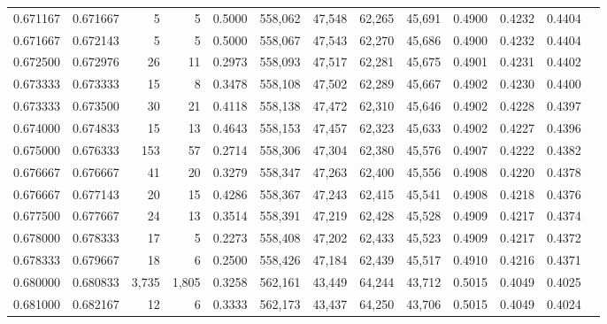 \begin{tabular}{rrrrrrrrrrrrr}
0.671167 & 0.671667 &      5 &     5 &                                     0.5000 & 558,062 &  47,548 &  62,265 &  45,691 & 0.4900 & 0.4232 & 0.4404 \\
0.671667 & 0.672143 &      5 &     5 &                                     0.5000 & 558,067 &  47,543 &  62,270 &  45,686 & 0.4900 & 0.4232 & 0.4404 \\
0.672500 & 0.672976 &     26 &    11 &                                     0.2973 & 558,093 &  47,517 &  62,281 &  45,675 & 0.4901 & 0.4231 & 0.4402 \\
0.673333 & 0.673333 &     15 &     8 &                                     0.3478 & 558,108 &  47,502 &  62,289 &  45,667 & 0.4902 & 0.4230 & 0.4400 \\
0.673333 & 0.673500 &     30 &    21 &                                     0.4118 & 558,138 &  47,472 &  62,310 &  45,646 & 0.4902 & 0.4228 & 0.4397 \\
0.674000 & 0.674833 &     15 &    13 &                                     0.4643 & 558,153 &  47,457 &  62,323 &  45,633 & 0.4902 & 0.4227 & 0.4396 \\
0.675000 & 0.676333 &    153 &    57 &                                     0.2714 & 558,306 &  47,304 &  62,380 &  45,576 & 0.4907 & 0.4222 & 0.4382 \\
0.676667 & 0.676667 &     41 &    20 &                                     0.3279 & 558,347 &  47,263 &  62,400 &  45,556 & 0.4908 & 0.4220 & 0.4378 \\
0.676667 & 0.677143 &     20 &    15 &                                     0.4286 & 558,367 &  47,243 &  62,415 &  45,541 & 0.4908 & 0.4218 & 0.4376 \\
0.677500 & 0.677667 &     24 &    13 &                                     0.3514 & 558,391 &  47,219 &  62,428 &  45,528 & 0.4909 & 0.4217 & 0.4374 \\
0.678000 & 0.678333 &     17 &     5 &                                     0.2273 & 558,408 &  47,202 &  62,433 &  45,523 & 0.4909 & 0.4217 & 0.4372 \\
0.678333 & 0.679667 &     18 &     6 &                                     0.2500 & 558,426 &  47,184 &  62,439 &  45,517 & 0.4910 & 0.4216 & 0.4371 \\
0.680000 & 0.680833 &  3,735 & 1,805 &                                     0.3258 & 562,161 &  43,449 &  64,244 &  43,712 & 0.5015 & 0.4049 & 0.4025 \\
0.681000 & 0.682167 &     12 &     6 &                                     0.3333 & 562,173 &  43,437 &  64,250 &  43,706 & 0.5015 & 0.4049 & 0.4024 \\

\end{tabular}
